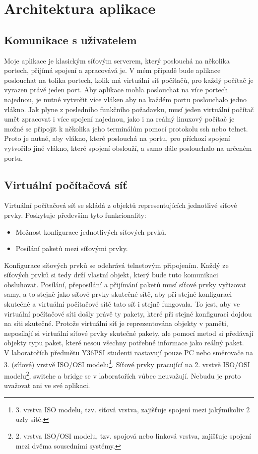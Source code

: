 \section{Architektura aplikace}

\subsection{Komunikace s uživatelem}

Moje aplikace je klasickým síťovým serverem, který poslouchá na několika portech, přijímá spojení a zpracovává je. V mém případě bude aplikace poslouchat na tolika portech, kolik má virtuální síť počítačů, pro každý počítač je vyrazen právě jeden port. Aby aplikace mohla poslouchat na více portech najednou, je nutné vytvořit více vláken aby na každém portu poslouchalo jedno vlákno. Jak plyne z posledního funkčního požadavku, musí jeden virtuální počítač umět zpracovat i více spojení najednou, jako i na reálný linuxový počítač je možné se připojit k několika jeho terminálům pomocí protokolu ssh nebo telnet. Proto je nutné, aby vlákno, které poslouchá na portu, pro příchozí spojení vytvořilo jiné vlákno, které spojení obslouží, a samo dále poslouchalo na určeném portu. 

\subsection{Virtuální počítačová síť}

Virtuální počítačová síť se skládá z objektů representujících jednotlivé síťové prvky. Poskytuje především tyto funkcionality:
\begin{itemize}
 \item Možnost konfigurace jednotlivých síťových prvků.
 \item Posílání paketů mezi síťovými prvky.
\end{itemize}
Konfigurace síťových prvků se odehrává telnetovým připojením. Každý ze síťových prvků si tedy drží vlastní objekt, který bude tuto komunikaci obsluhovat. Posílání, přeposílání a přijímání paketů musí síťové prvky vyřizovat samy, a to stejně jako síťové prvky skutečné sítě, aby při stejné konfiguraci skutečné a virtuální počítačové sítě tato síť i stejně fungovala. To jest, aby ve virtuální počítačové síti došly právě ty pakety, které při stejné konfiguraci dojdou na síti skutečné. Protože virtuální síť je reprezentována objekty v paměti, neposílají si virtuální síťové prvky skutečné pakety, ale pomocí metod si předávají objekty typu paket, které nesou všechny potřebné informace jako reálný paket.\\
V laboratořích předmětu Y36PSI studenti nastavují pouze PC nebo směrovače na 3. (síťové) vrstvě ISO/OSI modelu\footnote{3. vrstva ISO modelu, tzv. síťová vrstva, zajišťuje spojení mezi jakýmikoliv 2 uzly sítě.}. Síťové prvky pracující na 2. vrstvě ISO/OSI modelu\footnote{2. vrstva ISO/OSI modelu, tzv. spojová nebo linková vrstva, zajišťuje spojení mezi dvěma sousedními systémy.}, switche a bridge se v laboratořích vůbec neuvažují. Nebudu je proto uvažovat ani ve své aplikaci.
